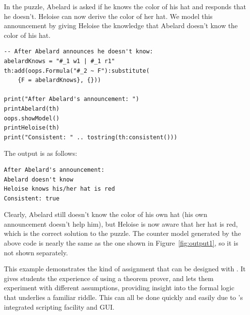 In the puzzle, Abelard is asked if he knows the color of his hat and responds that he doesn't. Heloise can now derive the color of her hat. We model this announcement by giving Heloise the knowledge that Abelard doesn't know the color of his hat.
\begin{lstlisting}
-- After Abelard announces he doesn't know:
abelardKnows = "#_1 w1 | #_1 r1"
th:add(oops.Formula("#_2 ~ F"):substitute(
    {F = abelardKnows}, {}))

print("After Abelard's announcement: ")
printAbelard(th)
oops.showModel()
printHeloise(th)
print("Consistent: " .. tostring(th:consistent()))
\end{lstlisting}
The output is as follows:
\begin{verbatim}
After Abelard's announcement:
Abelard doesn't know
Heloise knows his/her hat is red
Consistent: true
\end{verbatim}
Clearly, Abelard still doesn't know the color of his own hat (his own announcement doesn't help him), but Heloise is now aware that her hat is red, which is the correct solution to the puzzle.
The counter model generated by the above code is nearly the same as the one shown in Figure~\ref{fig:output1}, so it is not shown separately.

This example demonstrates the kind of assignment that can be designed with  \oops\/.
It gives students the experience of using a theorem prover, and lets them experiment with different assumptions, providing insight into the formal logic that underlies a familiar riddle.
This can all be done quickly and easily due to \oops's integrated scripting facility and GUI.
